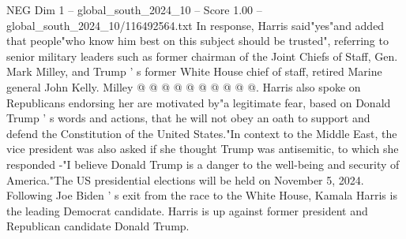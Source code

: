 \begin{textsample}{NEG Dim 1 – global\_south\_2024\_10 – Score 1.00 – global\_south\_2024\_10/116492564.txt}
In response, Harris said"yes"and added that people"who know him best on this subject should be trusted", referring to senior military leaders such as former chairman of the Joint Chiefs of Staff, Gen.
Mark Milley, and Trump ' s former White House chief of staff, retired Marine general John Kelly.
Milley @ @ @ @ @ @ @ @ @ @.
Harris also spoke on Republicans endorsing her are motivated by"a legitimate fear, based on Donald Trump ' s words and actions, that he will not obey an oath to support and defend the Constitution of the United States."In context to the Middle East, the vice president was also asked if she thought Trump was antisemitic, to which she responded -"I believe Donald Trump is a danger to the well-being and security of America."The US presidential elections will be held on November 5, 2024.
Following Joe Biden ' s exit from the race to the White House, Kamala Harris is the leading Democrat candidate.
Harris is up against former president and Republican candidate Donald Trump.

\end{textsample}
